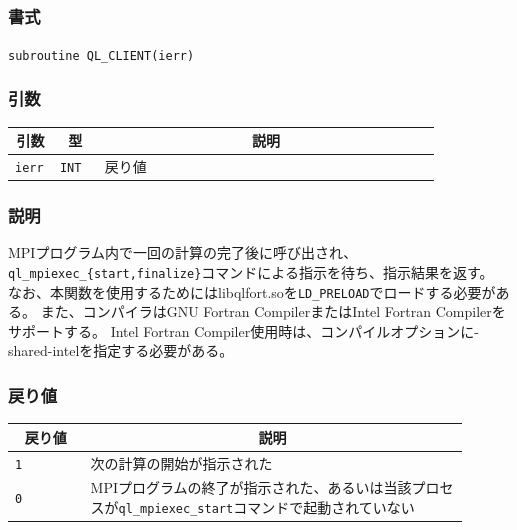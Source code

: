 \documentclass[twoside,11pt,fleqn]{book}
\begin{document}
\subsection{}
\subsubsection*{書式}{\quad} \texttt{subroutine QL\_CLIENT(ierr)}
\subsubsection*{引数}{\quad}
\begin{table}[!ht]
\footnotesize
\begin{tabular}{|p{0.10\linewidth}|p{0.10\linewidth}|p{0.75\linewidth}|} \hline
\multicolumn{1}{|c}{\textbf{引数}}&\multicolumn{1}{|c}{\textbf{型}}&\multicolumn{1}{|c|}{\textbf{説明}}\\ \hline \hline
\texttt{ierr}&\texttt{INT}&戻り値\\ \hline
\end{tabular}
\vspace{-0em}
\end{table}
\subsubsection*{説明}{\quad}
MPIプログラム内で一回の計算の完了後に呼び出され、\texttt{ql\_mpiexec\_\{start,finalize\}}コマンドによる指示を待ち、指示結果を返す。
なお、本関数を使用するためにはlibqlfort.soを\texttt{LD\_PRELOAD}でロードする必要がある。
また、コンパイラはGNU Fortran CompilerまたはIntel Fortran Compilerをサポートする。
Intel Fortran Compiler使用時は、コンパイルオプションに-shared-intelを指定する必要がある。

\subsubsection*{戻り値}{\quad}
\begin{table}[!ht]
\footnotesize
\begin{tabular}{|p{0.15\linewidth}|p{0.75\linewidth}|} \hline
\multicolumn{1}{|c}{\textbf{戻り値}}&\multicolumn{1}{|c|}{\textbf{説明}}\\ \hline \hline
\texttt{\texttt{1}}&次の計算の開始が指示された\\ \hline
\texttt{\texttt{0}}&MPIプログラムの終了が指示された、あるいは当該プロセスが\texttt{ql\_mpiexec\_start}コマンドで起動されていない\\ \hline
\end{tabular}
\vspace{-0em}
\end{table}
\FloatBarrier
\end{document}
